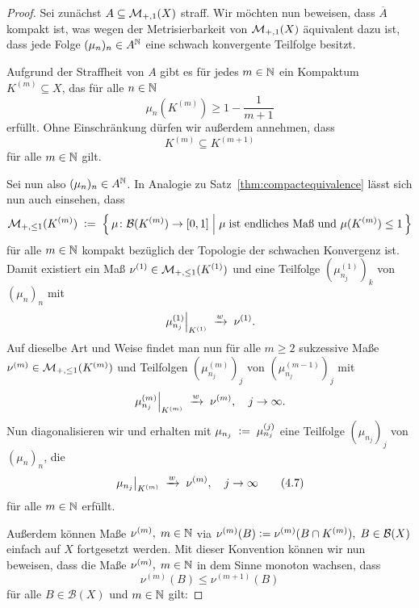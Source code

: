 \documentclass[../main/main.tex]{subfiles}
\begin{document}
	\begin{proof}
		Sei zunächst $A \subseteq \mathcal{M}_{+,1}(X)$ straff. Wir möchten nun beweisen, dass $\overline{A}$ 
		kompakt ist, was wegen der Metrisierbarkeit von $\mathcal{M}_{+,1}(X)$ äquivalent dazu ist,
		dass jede Folge $(\mu_n)_n \in A^{\mathbb{N}}$ eine schwach konvergente Teilfolge besitzt. 
		
		Aufgrund der Straffheit von $A$ gibt es für jedes $m \in \mathbb{N}$ ein Kompaktum $K^{(m)} \subseteq X$, 
		das für alle $n \in \mathbb{N}$
		\[ \mu_n(K^{(m)}) \geq 1 - \frac{1}{m+1} \label{4.5} \tag{4.5} \]
		erfüllt. Ohne Einschränkung dürfen wir außerdem annehmen, dass 
		\[ K^{(m)} \subseteq K^{(m+1)} \label{4.6} \tag{4.6} \] 
		für alle $m \in \mathbb{N}$ gilt.
		
		Sei nun also $(\mu_n)_n \in A^{\mathbb{N}}$.
		In Analogie zu Satz~\ref{thm:compactequivalence} lässt sich nun auch einsehen, dass 
		\[ \mathcal{M}_{+,\leq 1}(K^{(m)}) \; \vcentcolon = \; \left\{\, \mu \colon \mathcal{B}(K^{(m)}) \to [0,1] \; \middle| \; \mu \; 
			\text{ist endliches Maß und } \mu(K^{(m)}) \leq 1 \,\right\} \]
		für alle $m \in \mathbb{N}$ kompakt bezüglich der Topologie der schwachen Konvergenz ist. Damit existiert ein Maß 
		$\nu^{(1)} \in \mathcal{M}_{+,\leq 1}(K^{(1)})$ und eine Teilfolge $(\mu_{n_j}^{(1)})_k$ von $(\mu_n)_n$ mit
		\[ \left.\mu_{n_j}^{(1)}\right|_{K^{(1)}} \; \xrightarrow{w} \; \nu^{(1)} \text{.} \]
		Auf dieselbe Art und Weise findet man nun für alle $m\geq 2$ sukzessive Maße 
		$\nu^{(m)} \in \mathcal{M}_{+,\leq 1}(K^{(m)})$ und Teilfolgen $(\mu_{n_j}^{(m)})_j$ von $(\mu_{n_j}^{(m-1)})_j$ mit
		\[ \left.\mu_{n_j}^{(m)}\right|_{K^{(m)}} \; \xrightarrow{w} \; \nu^{(m)}, \quad j \to \infty \text{.} \]
		Nun diagonalisieren wir und erhalten mit $\mu_{n_j} \; \vcentcolon = \; \mu_{n_j}^{(j)}$ eine Teilfolge 
		$(\mu_{n_j})_j$ von $(\mu_n)_n$, die
		\[ \left.\mu_{n_j}\right|_{K^{(m)}} \; \xrightarrow{w} \; \nu^{(m)}, \quad j \to \infty \label{4.7} \tag{4.7} \]
		für alle $m \in \mathbb{N}$ erfüllt.
		
		Außerdem können Maße $\nu^{(m)}, \; m \in \mathbb{N}$ via 
		$\nu^{(m)}(B) \vcentcolon = \nu^{(m)}(B \cap K^{(m)}), \; B \in \mathcal{B}(X)$ einfach auf $X$ fortgesetzt werden. 
		Mit dieser Konvention können wir nun beweisen, dass die Maße
		$\nu^{(m)}, \; m \in \mathbb{N}$ in dem Sinne monoton wachsen, dass 
		\[ \nu^{(m)}(B) \leq \nu^{(m+1)}(B) \label{4.8} \tag{4.8} \]
		für alle $B \in \mathcal{B}(X)$ und $m \in \mathbb{N}$ gilt:
		

\end{proof}
\end{document}
